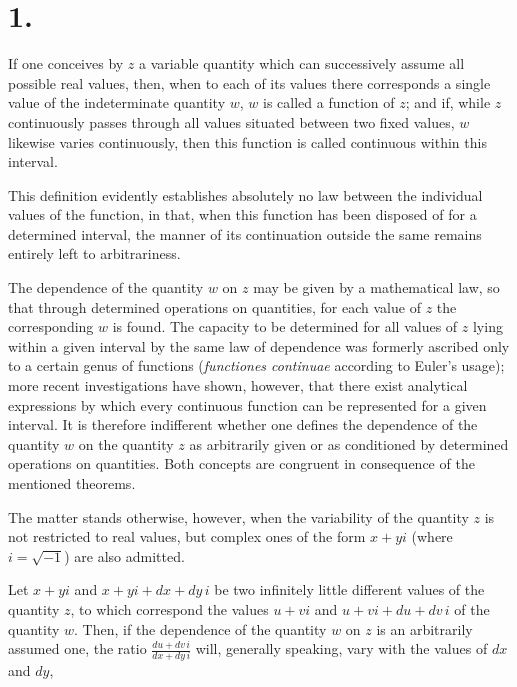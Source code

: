 \documentclass{article}
\begin{document}
\section*{1.}

If one conceives by $z$ a variable quantity which can successively assume all possible real values, then, when to each of its values there corresponds a single value of the indeterminate quantity $w$, $w$ is called a function of $z$; and if, while $z$ continuously passes through all values situated between two fixed values, $w$ likewise varies continuously, then this function is called continuous within this interval.

This definition evidently establishes absolutely no law between the individual values of the function, in that, when this function has been disposed of for a determined interval, the manner of its continuation outside the same remains entirely left to arbitrariness.

The dependence of the quantity $w$ on $z$ may be given by a mathematical law, so that through determined operations on quantities, for each value of $z$ the corresponding $w$ is found. The capacity to be determined for all values of $z$ lying within a given interval by the same law of dependence was formerly ascribed only to a certain genus of functions (\emph{functiones continuae} according to Euler's usage); more recent investigations have shown, however, that there exist analytical expressions by which every continuous function can be represented for a given interval. It is therefore indifferent whether one defines the dependence of the quantity $w$ on the quantity $z$ as arbitrarily given or as conditioned by determined operations on quantities. Both concepts are congruent in consequence of the mentioned theorems.

The matter stands otherwise, however, when the variability of the quantity $z$ is not restricted to real values, but complex ones of the form $x + yi$ (where $i = \sqrt{-1}$) are also admitted.

Let $x + yi$ and $x + yi + dx + dy\,i$ be two infinitely little different values of the quantity $z$, to which correspond the values $u + vi$ and $u + vi + du + dv\,i$ of the quantity $w$. Then, if the dependence of the quantity $w$ on $z$ is an arbitrarily assumed one, the ratio $\frac{du + dv\,i}{dx + dy\,i}$ will, generally speaking, vary with the values of $dx$ and $dy$,
\end{document}

